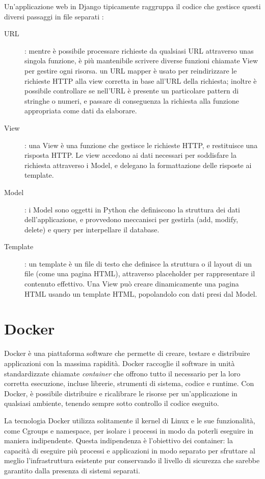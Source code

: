 Un'applicazione web in Django tipicamente raggruppa il codice che gestisce questi diversi passaggi in file separati \cite{mdn-django-documentation}:
\begin{description}
	\item[URL]: mentre è possibile processare richieste da qualsiasi URL attraverso unas singola funzione, è più mantenibile scrivere diverse funzioni chiamate
	View per gestire ogni risorsa. un URL mapper è usato per reindirizzare le richieste HTTP alla view corretta in base all'URL della richiesta; inoltre è 
	possibile controllare se nell'URL è presente un particolare pattern di stringhe o numeri, e passare di conseguenza la richiesta alla funzione appropriata
	come dati da elaborare.
	\item[View]: una View è una funzione che gestisce le richieste HTTP, e restituisce una risposta HTTP. Le view accedono ai dati necessari per soddisfare la 
	richiesta attraverso i Model, e delegano la formattazione delle risposte ai template. 
	\item[Model]: i Model sono oggetti in Python che definiscono la struttura dei dati dell'applicazione, e provvedono meccanisci per gestirla (add, modify, 
	delete) e query per interpellare il database.
	\item[Template]: un template è un file di testo che definisce la struttura o il layout di un file (come una pagina HTML), attraverso placeholder per 
	rappresentare il contenuto effettivo. Una View può creare dinamicamente una pagina HTML usando un template HTML, popolandolo con dati presi dal Model. 
\end{description}

\section{Docker}
Docker è una piattaforma software che permette di creare, testare e distribuire applicazioni con la massima rapidità. Docker raccoglie 
il software in unità standardizzate chiamate \textit{container} che offrono tutto il necessario per la loro corretta esecuzione, incluse librerie, 
strumenti di sistema, codice e runtime. Con Docker, è possibile distribuire e ricalibrare le risorse per un'applicazione in qualsiasi ambiente, 
tenendo sempre sotto controllo il codice eseguito.

La tecnologia Docker utilizza solitamente il kernel di Linux e le sue funzionalità, come Cgroups e namespace, per isolare i processi in modo da poterli 
eseguire in maniera indipendente. Questa indipendenza è l'obiettivo dei container: la capacità di eseguire più processi e applicazioni in 
modo separato per sfruttare al meglio l'infrastruttura esistente pur conservando il livello di sicurezza che sarebbe garantito dalla 
presenza di sistemi separati.

